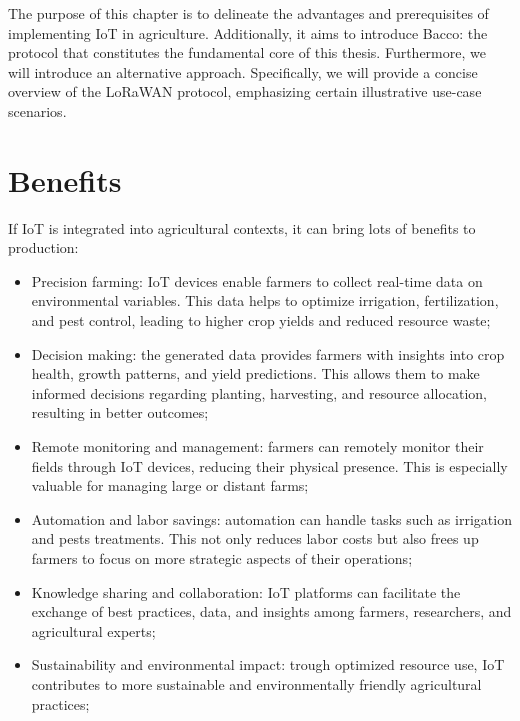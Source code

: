 

The purpose of this chapter is to delineate the advantages and prerequisites of implementing \gls{IoT} in agriculture.
Additionally, it aims to introduce Bacco: the protocol that constitutes the fundamental core of this thesis. Furthermore,
we will introduce an alternative approach. Specifically, we will provide a concise overview of the \gls{LoRaWAN}
protocol, emphasizing certain illustrative use-case scenarios.

\section{Benefits}
\label{sec: benefits}
If \gls{IoT} is integrated into agricultural contexts, it can bring lots of benefits to production:
\begin{itemize}
    \item Precision farming: IoT devices enable farmers to collect real-time data on environmental variables. This data
        helps to optimize irrigation, fertilization, and pest control, leading to higher crop yields and reduced resource
        waste;
    \item Decision making: the generated data provides farmers with insights into crop health, growth
        patterns, and yield predictions. This allows them to make informed decisions regarding planting, harvesting, and
        resource allocation, resulting in better outcomes;
    \item Remote monitoring and management: farmers can remotely monitor their fields through IoT devices,
        reducing their physical presence. This is especially valuable for managing large or distant
        farms;
    \item Automation and labor savings: automation can handle tasks such as irrigation and pests
        treatments. This not only reduces labor costs but also frees up farmers to focus on more strategic aspects of
        their operations;
    \item Knowledge sharing and collaboration: IoT platforms can facilitate the exchange of best practices, data, and
        insights among farmers, researchers, and agricultural experts;
    \item Sustainability and environmental impact: trough optimized resource use, IoT contributes to more sustainable
        and environmentally friendly agricultural practices;
\end{itemize}

